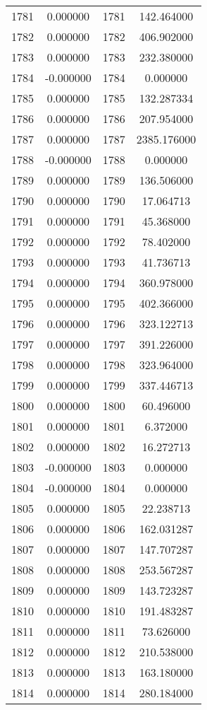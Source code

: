 \documentclass[12pt]{article}
\begin{document}
\begin{longtable}{@{}cccc@{}}
1781 & 0.000000 & 1781 & 142.464000 \\
1782 & 0.000000 & 1782 & 406.902000 \\
1783 & 0.000000 & 1783 & 232.380000 \\
1784 & -0.000000 & 1784 & 0.000000 \\
1785 & 0.000000 & 1785 & 132.287334 \\
1786 & 0.000000 & 1786 & 207.954000 \\
1787 & 0.000000 & 1787 & 2385.176000 \\
1788 & -0.000000 & 1788 & 0.000000 \\
1789 & 0.000000 & 1789 & 136.506000 \\
1790 & 0.000000 & 1790 & 17.064713 \\
1791 & 0.000000 & 1791 & 45.368000 \\
1792 & 0.000000 & 1792 & 78.402000 \\
1793 & 0.000000 & 1793 & 41.736713 \\
1794 & 0.000000 & 1794 & 360.978000 \\
1795 & 0.000000 & 1795 & 402.366000 \\
1796 & 0.000000 & 1796 & 323.122713 \\
1797 & 0.000000 & 1797 & 391.226000 \\
1798 & 0.000000 & 1798 & 323.964000 \\
1799 & 0.000000 & 1799 & 337.446713 \\
1800 & 0.000000 & 1800 & 60.496000 \\
1801 & 0.000000 & 1801 & 6.372000 \\
1802 & 0.000000 & 1802 & 16.272713 \\
1803 & -0.000000 & 1803 & 0.000000 \\
1804 & -0.000000 & 1804 & 0.000000 \\
1805 & 0.000000 & 1805 & 22.238713 \\
1806 & 0.000000 & 1806 & 162.031287 \\
1807 & 0.000000 & 1807 & 147.707287 \\
1808 & 0.000000 & 1808 & 253.567287 \\
1809 & 0.000000 & 1809 & 143.723287 \\
1810 & 0.000000 & 1810 & 191.483287 \\
1811 & 0.000000 & 1811 & 73.626000 \\
1812 & 0.000000 & 1812 & 210.538000 \\
1813 & 0.000000 & 1813 & 163.180000 \\
1814 & 0.000000 & 1814 & 280.184000 \\

\end{longtable}
\end{document}
